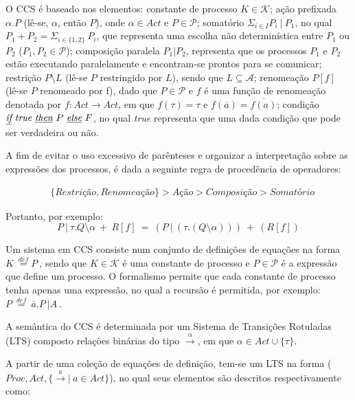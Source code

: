 O CCS é baseado nos elementos: constante de processo $K \in \mathcal{K}$; ação prefixada $\alpha.P$ (lê-se, $\alpha$, então $P$), onde $\alpha \in Act$ e $P \in \mathcal{P}$; somatório $\Sigma_{i\in I} P_{i}~|~P_{1}$, no qual $P_{1} + P_{2} = \Sigma_{i\in \{1,2\}}~P_{i}$, que representa uma escolha não determinística entre $P_{1}$ ou $P_{2}$ ($P_{1}, P_{2} \in \mathcal{P}$); composição paralela $P_{1} | P_{2}$, representa que os processos $P_{1}$ e $P_{2}$ estão executando paralelamente e encontram-se prontos para se comunicar; restrição $P \setminus L$ (lê-se $P$ restringido por $L$), sendo que $L \subseteq \mathcal{A}$; renomeação $P[f]$ (lê-se $P$ renomeado por f), dado que $P \in \mathcal{P}$ e $f$ é uma função de renomeação denotada por $f : Act \longrightarrow Act$, em que $f(\tau) = \tau$ e $f(\overline{a}) = \overline{f(a)}$; condição $\textit{\underline{if}}~\textit{true}~\textit{\underline{then}}~P~\textit{\underline{else}}~F$, no qual \textit{true} representa que uma dada condição que pode ser verdadeira ou não.    

A fim de evitar o uso excessivo de parênteses e organizar a interpretação sobre as expressões dos processos, é dada a seguinte regra de procedência de operadores:

\begin{align*}
 &\{Restrição, Renomeação\} > Ação > Composição > Somatório
\end{align*}

Portanto, por exemplo:
\begin{equation}
P~|~\tau.Q\setminus\alpha~+~R[f]~=~(P~|~(\tau.(Q\setminus\alpha)))~+~(R[f]) 
\end{equation}

Um sistema em CCS consiste num conjunto de definições de equações na forma $K~\stackrel{def}{=}P~$, sendo que $K \in \mathcal{K}$ é uma constante de processo e $P \in \mathcal{P}$ é a expressão que define um processo. O formalismo permite que cada constante de processo tenha apenas uma expressão, no qual a recursão é permitida, por exemplo: $P~\stackrel{def}{=}~\overline{a}.P~|A~$.

A semântica do CCS é determinada por um Sistema de Transições Rotuladas (LTS) composto relações binárias do tipo $\stackrel{\alpha}{\longrightarrow}$, em que $\alpha \in Act\cup\{\tau\}$.

A partir de uma coleção de equações de definição, tem-se um LTS na forma ($Proc, Act, \{\stackrel{a}{\longrightarrow}|~a \in Act\}$), no qual seus elementos são descritos respectivamente como:

